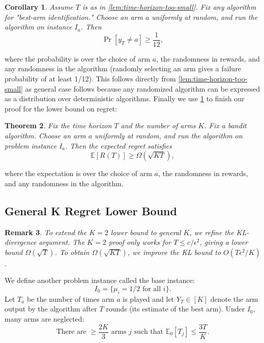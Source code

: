 \documentclass[12pt]{article}
\newtheorem{theorem}{Theorem}[section]
\newtheorem{corollary}[theorem]{Corollary}
\newtheorem{remark}[theorem]{Remark}
\begin{document}
\vspace{5mm}


\begin{corollary}
\label{cor:best-arm-not-a}
Assume $T$ is as in \ref{lem:time-horizon-too-small}. Fix any algorithm for "best-arm identification." Choose an arm $a$ uniformly at random, and run the algorithm on instance $I_a$. Then
\[
\Pr[y_T \neq a] \ge \frac{1}{12},
\]
\end{corollary}


where the probability is over the choice of arm $a$, the randomness in rewards, and any randomness in the algorithm (randomly selecting an arm gives a failure probability of at least 1/12). This follows directly from \ref{lem:time-horizon-too-small} as general case follows because any randomized algorithm can be expressed as a distribution over deterministic algorithms. Finally we use \ref{cor:best-arm-not-a} to finish our proof for the lower bound on regret:

\vspace{5mm}

\begin{theorem}
Fix the time horizon $T$ and the number of arms $K$. Fix a bandit algorithm. Choose an arm $a$ uniformly at random, and run the algorithm on problem instance $I_a$. Then the expected regret satisfies
\[
\mathbb{E}[R(T)] \ge \Omega(\sqrt{K T}),
\]
\end{theorem}

where the expectation is over the choice of arm $a$, the randomness in rewards, and any randomness in the algorithm. 

\vspace{5mm}

\subsection{General K Regret Lower Bound}

\begin{remark}
To extend the $K=2$ lower bound to general $K$, we refine the KL-divergence argument. The $K=2$ proof only works for $T \le c/\epsilon^2$, giving a lower bound $\Omega(\sqrt{T})$. To obtain $\Omega(\sqrt{KT})$, we improve the KL bound to $O(T\epsilon^2/K)$.
\end{remark}


\vspace{5mm}

\noindent We define another problem instance called the base instance:
\[
I_0 = \{\mu_i = 1/2 \text{ for all } i\}.
\]
Let $T_a$ be the number of times arm $a$ is played and let $Y_T \in [K]$ denote the arm output by the algorithm after $T$ rounds (its estimate of the best arm). Under $I_0$, many arms are neglected:
\begin{equation}
\text{There are } \ge \frac{2K}{3} \text{ arms } j \text{ such that } 
\mathbb{E}_0[T_j] \le \frac{3T}{K}.
\label{eq:expected-plays}
\tag{4.3}
\end{equation}
\end{document}
